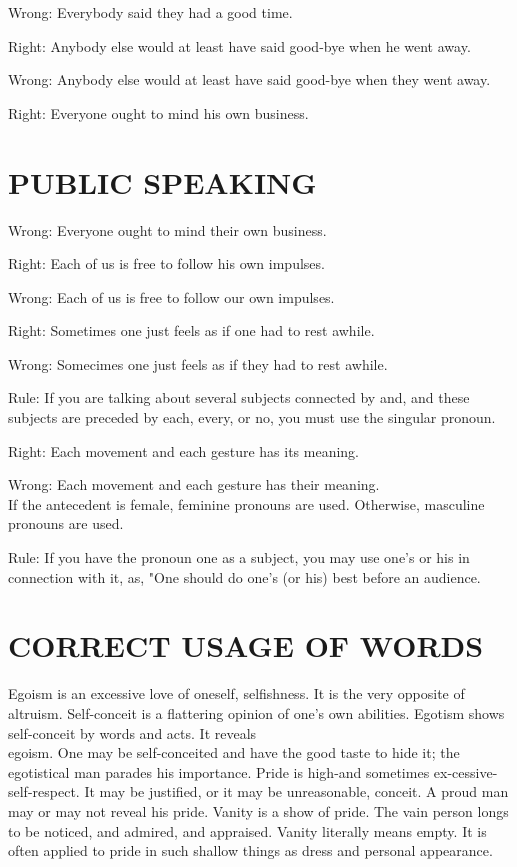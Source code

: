 \documentclass[10pt]{article}
\begin{document}
Wrong: Everybody said they had a good time.

Right: Anybody else would at least have said good-bye when he went away.

Wrong: Anybody else would at least have said good-bye when they went away.

Right: Everyone ought to mind his own business.

\section*{PUBLIC SPEAKING}
Wrong: Everyone ought to mind their own business.

Right: Each of us is free to follow his own impulses.

Wrong: Each of us is free to follow our own impulses.

Right: Sometimes one just feels as if one had to rest awhile.

Wrong: Somecimes one just feels as if they had to rest awhile.

Rule: If you are talking about several subjects connected by and, and these subjects are preceded by each, every, or no, you must use the singular pronoun.

Right: Each movement and each gesture has its meaning.

Wrong: Each movement and each gesture has their meaning.\\
If the antecedent is female, feminine pronouns are used. Otherwise, masculine pronouns are used.

Rule: If you have the pronoun one as a subject, you may use one's or his in connection with it, as, "One should do one's (or his) best before an audience.

\section*{CORRECT USAGE OF WORDS}
Egoism is an excessive love of oneself, selfishness. It is the very opposite of altruism. Self-conceit is a flattering opinion of one's own abilities. Egotism shows self-conceit by words and acts. It reveals\\
egoism. One may be self-conceited and have the good taste to hide it; the egotistical man parades his importance. Pride is high-and sometimes ex-cessive-self-respect. It may be justified, or it may be unreasonable, conceit. A proud man may or may not reveal his pride. Vanity is a show of pride. The vain person longs to be noticed, and admired, and appraised. Vanity literally means empty. It is often applied to pride in such shallow things as dress and personal appearance.
\end{document}

